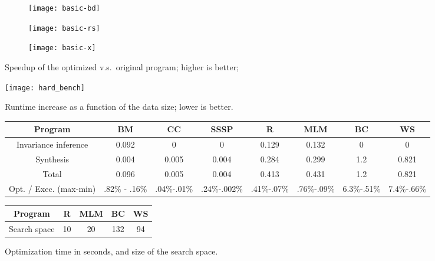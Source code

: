     \begin{figure*}
      \begin{subfigure}[b]{0.33\textwidth}
        \centering
        \texttt{[image: basic-bd]}
      \end{subfigure}
      \hfill
      \begin{subfigure}[b]{0.33\textwidth}
        \centering
        \texttt{[image: basic-rs]}
      \end{subfigure}
      \hfill
      \begin{subfigure}[b]{0.33\textwidth}
        \centering
        \texttt{[image: basic-x]}
      \end{subfigure}
      \caption{Speedup of the optimized v.s.\ original program; higher is better; 
      }\label{fig:eval:eqsat}
    \end{figure*}
    
    \begin{figure*}
        \centering
        \texttt{[image: hard\_bench]}
        \caption{Runtime increase as a function of the data size; lower is  better.}\label{fig:eval:hard}
    \end{figure*}
    
    \begin{figure*}
      \centering
    {\footnotesize
     \begin{tabular}{ c | c c c | c c c c }
     Program & BM & CC & SSSP & R & MLM & BC & WS \\
     \hline
     Invariance inference & 0.092 & 0 & 0 & 0.129 & 0.132 & 0 & 0\\
     Synthesis & 0.004 & 0.005 & 0.004 & 0.284 & 0.299 & 1.2 & 0.821 \\
     \hline
     Total & 0.096 & 0.005 & 0.004 & 0.413 & 0.431 & 1.2 & 0.821 \\
     Opt. / Exec. (max-min) & .82\% - .16\% & .04\%-.01\% & .24\%-.002\% & .41\%-.07\% & .76\%-.09\% & 6.3\%-.51\% & 7.4\%-.66\%
    \end{tabular}
    \qquad
    \begin{tabular}{ c | c c c c }
     Program & R & MLM & BC & WS \\
     \hline
     Search space & 10 & 20 & 132 & 94 \\
    \end{tabular}
    }
      \caption{Optimization time in seconds, 
       and  size of the search space. }
      \label{fig:synthesis:time:space}
    \end{figure*}
    
